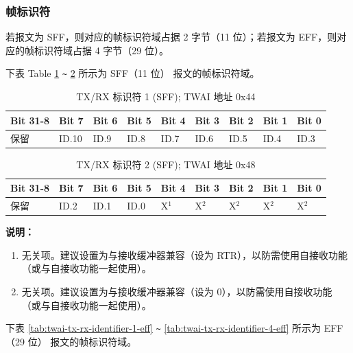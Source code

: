 \documentclass[main\_\_CN.tex]{subfiles}
\begin{document}
\subsubsection{帧标识符}
若报文为 SFF，则对应的帧标识符域占据 2 字节（11 位）；若报文为 EFF，则对应的帧标识符域占据 4 字节（29 位）。

下表 Table \ref{tab:twai-tx-rx-identifier-1-sff} \verb+~+ \ref{tab:twai-tx-rx-identifier-2-sff} 所示为 SFF（11 位） 报文的帧标识符域。

\begin{longtable}[c]{|p{1.4cm}|p{1.4cm}|p{1.4cm}|p{1.4cm}|p{1.4cm}|p{1.4cm}|p{1.4cm}|p{1.4cm}|p{1.4cm}|}
    \caption{TX/RX 标识符 1 (SFF); TWAI 地址 0x44}
    \label{tab:twai-tx-rx-identifier-1-sff}\\
    \hline
       \rowcolor{lightgray}
    \textbf{Bit 31-8} & \textbf{Bit 7} & \textbf{Bit 6} & \textbf{Bit 5} & \textbf{Bit 4} & \textbf{Bit 3} & \textbf{Bit 2} & \textbf{Bit 1} & \textbf{Bit 0}\\\hline
    保留 & ID.10 & ID.9 & ID.8 & ID.7 & ID.6 & ID.5 & ID.4 & ID.3\\
    \hline
\end{longtable}

\begin{longtable}[c]{|p{1.4cm}|p{1.4cm}|p{1.4cm}|p{1.4cm}|p{1.4cm}|p{1.4cm}|p{1.4cm}|p{1.4cm}|p{1.4cm}|}
    \caption{TX/RX 标识符 2 (SFF); TWAI 地址 0x48}
    \label{tab:twai-tx-rx-identifier-2-sff}\\
    \hline
       \rowcolor{lightgray}
    \textbf{Bit 31-8} & \textbf{Bit 7} & \textbf{Bit 6} & \textbf{Bit 5} & \textbf{Bit 4} & \textbf{Bit 3} & \textbf{Bit 2} & \textbf{Bit 1} & \textbf{Bit 0}\\\hline
    保留 & ID.2 & ID.1 & ID.0 & X$^1$ & X$^2$ & X$^2$ & X$^2$ & X$^2$\\
    \hline
\end{longtable}
\vspace{-1.5em}
{\bfseries 说明：}\\
\begin{enumerate}
    \item 无关项。建议设置为与接收缓冲器兼容（设为 RTR），以防需使用自接收功能（或与自接收功能一起使用）。
    \item 无关项。建议设置为与接收缓冲器兼容（设为 0），以防需使用自接收功能（或与自接收功能一起使用）。
\end{enumerate}

下表 \ref{tab:twai-tx-rx-identifier-1-eff} \verb+~+ \ref{tab:twai-tx-rx-identifier-4-eff} 所示为 EFF（29 位） 报文的帧标识符域。
\end{document}
